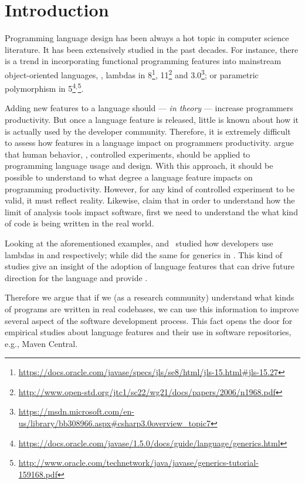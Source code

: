 
\chapter{Introduction}

Programming language design has been always a hot topic in computer science literature.
It has been extensively studied in the past decades.
For instance, there is a trend in incorporating functional programming features into mainstream object-oriented languages, \eg{}, lambdas in \java{} 8\footnote{\url{https://docs.oracle.com/javase/specs/jls/se8/html/jls-15.html\#jls-15.27}}, \cpp{}11\footnote{\url{http://www.open-std.org/jtc1/sc22/wg21/docs/papers/2006/n1968.pdf}} and \cs{} 3.0\footnote{\url{https://msdn.microsoft.com/en-us/library/bb308966.aspx\#csharp3.0overview_topic7}};
or parametric polymorphism in \java{} 5\footnote{\url{https://docs.oracle.com/javase/1.5.0/docs/guide/language/generics.html}}$^{,}$\footnote{\url{http://www.oracle.com/technetwork/java/javase/generics-tutorial-159168.pdf}}.

Adding new features to a language should --- \emph{in theory} --- increase programmers productivity.
But once a language feature is released, little is known about how it is actually used by the developer community.
Therefore, it is extremely difficult to assess how features in a language impact on programmers productivity.
\cite{hanenberg_faith_2010,hanenberg_why_2014} argue that human behavior, \ie{}, controlled experiments, should be applied to programming language usage and design.
With this approach, it should be possible to understand to what degree a language feature impacts on programming productivity.
However, for any kind of controlled experiment to be valid, it must reflect reality.
Likewise, \cite{livshits_defense_2015} claim that in order to understand how the limit of analysis tools impact software,
first we need to understand the what kind of code is being written in the real world.

Looking at the aforementioned examples, \cite{mazinanian_understanding_2017} and~\cite{uesbeck_empirical_2016}
studied how developers use lambdas in \java{} and \cpp{} respectively; while \cite{parnin_java_2011,parnin_adoption_2013} did the same for generics in \java{}.
This kind of studies give an insight of the adoption of language features that can drive future direction for the language and provide .

Therefore we argue that if we (as a research community) understand what kinds of programs are written in real codebases,
we can use this information to improve several aspect of the software development process.
This fact opens the door for empirical studies about language features and their use in
software repositories, e.g., Maven Central.


